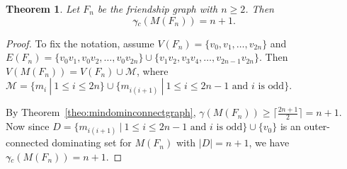 \documentclass[a4paper,12pt, reqno]{amsart}
\newtheorem{Theorem}{Theorem}[section]
\newtheorem{Definition}[Theorem]{Definition}
\begin{document}


\begin{Theorem}\label{outfriendship}
	Let $F_n$ be the friendship graph with $n\ge2$. Then $$\gamma{\tilde{}} _{c}(M(F_n))= n+1.$$
\end{Theorem}
\begin{proof} To fix the notation, assume $V(F_n)=\{v_0,v_1,\dots, v_{2n}\}$ and $E(F_n)=\{v_0v_1,v_0v_2,\dots, v_0v_{2n}\}\cup\{v_1v_2, v_3v_4,\dots,v_{2n-1}v_{2n}\}$. Then $V(M(F_n))=V(F_n)\cup \mathcal{M}$, where $\mathcal{M}=\{ m_i~|~1\leq i \leq 2n \}\cup\{ m_{i(i+1)}~|~1\leq i \leq 2n-1 \text{ and } i \text{ is odd}\}$. 
	

By Theorem~\ref{theo:mindominconnectgraph}, $\gamma(M(F_n))\ge \lceil\frac{2n+1}{2} \rceil=n+1$. Now since  $D=\{ m_{i(i+1)}~|~1\leq i \leq 2n-1 \text{ and } i \text{ is odd}\}\cup\{v_0\}$ is an outer-connected dominating set for $M(F_n)$ with $|D|=n+1$, we have $\gamma{\tilde{}} _{c}(M(F_n))= n+1.$  
\end{proof}
\end{document}
